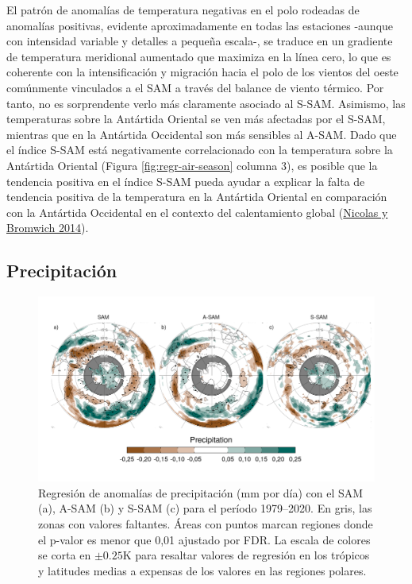 \documentclass[12pt,oneside,a4paper]{reedthesis}
\begin{document}
El patrón de anomalías de temperatura negativas en el polo rodeadas de anomalías positivas, evidente aproximadamente en todas las estaciones -aunque con intensidad variable y detalles a pequeña escala-, se traduce en un gradiente de temperatura meridional aumentado que maximiza en la línea cero, lo que es coherente con la intensificación y migración hacia el polo de los vientos del oeste comúnmente vinculados a el SAM a través del balance de viento térmico.
Por tanto, no es sorprendente verlo más claramente asociado al S-SAM.
Asimismo, las temperaturas sobre la Antártida Oriental se ven más afectadas por el S-SAM, mientras que en la Antártida Occidental son más sensibles al A-SAM.
Dado que el índice S-SAM está negativamente correlacionado con la temperatura sobre la Antártida Oriental (Figura \ref{fig:regr-air-season} columna 3), es posible que la tendencia positiva en el índice S-SAM pueda ayudar a explicar la falta de tendencia positiva de la temperatura en la Antártida Oriental en comparación con la Antártida Occidental en el contexto del calentamiento global (\protect\hyperlink{ref-nicolas2014}{Nicolas y Bromwich 2014}).

\hypertarget{precipitaciuxf3n}{%
\subsection{Precipitación}\label{precipitaciuxf3n}}



\begin{figure}

{\centering \includegraphics{figures/30-sam/global-pp-1} 

}

\caption{Regresión de anomalías de precipitación (mm por día) con el SAM (a), A-SAM (b) y S-SAM (c) para el período 1979--2020. En gris, las zonas con valores faltantes. Áreas con puntos marcan regiones donde el p-valor es menor que 0,01 ajustado por FDR. La escala de colores se corta en \(\pm0.25 \mathrm{K}\) para resaltar valores de regresión en los trópicos y latitudes medias a expensas de los valores en las regiones polares.}\label{fig:global-pp}
\end{figure}
\end{document}
